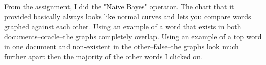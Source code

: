 \documentclass[10pt]{article}
\begin{document}
From the assignment, I did the "Naive Bayes" operator. The chart that it provided basically always looks like normal curves and lets you compare words graphed against each other. Using an example of a word that exists in both documents--oracle--the graphs completely overlap. Using an example of a top word in one document and non-existent in the other--false--the graphs look much further apart then the majority of the other words I clicked on. 
\par
{}%
\hfill
{}%
\par
\end{document}
